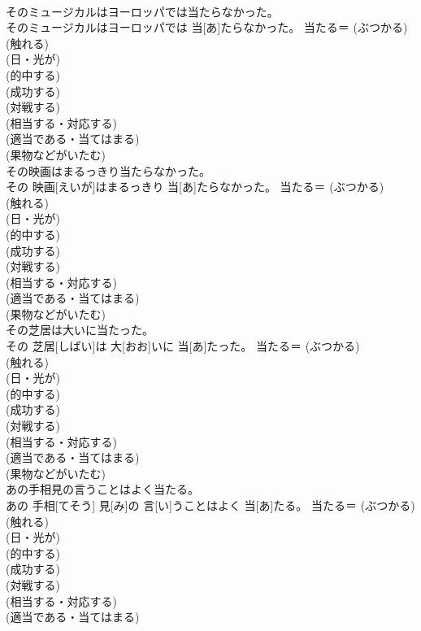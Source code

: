 \documentclass[8pt]{extreport}
\begin{document}
\begin{CJK}{UTF8}{min}
{\\	そのミュージカルはヨーロッパでは当たらなかった。	
\\	そのミュージカルはヨーロッパでは 当[あ]たらなかった。	当たる＝ (ぶつかる) 
\\	(触れる) 
\\	(日・光が) 
\\	(的中する) 
\\	(成功する) 
\\	(対戦する) 
\\	(相当する・対応する) 
\\	(適当である・当てはまる) 
\\	(果物などがいたむ)
\\	その映画はまるっきり当たらなかった。	
\\	その 映画[えいが]はまるっきり 当[あ]たらなかった。	当たる＝ (ぶつかる) 
\\	(触れる) 
\\	(日・光が) 
\\	(的中する) 
\\	(成功する) 
\\	(対戦する) 
\\	(相当する・対応する) 
\\	(適当である・当てはまる) 
\\	(果物などがいたむ)
\\	その芝居は大いに当たった。	
\\	その 芝居[しばい]は 大[おお]いに 当[あ]たった。	当たる＝ (ぶつかる) 
\\	(触れる) 
\\	(日・光が) 
\\	(的中する) 
\\	(成功する) 
\\	(対戦する) 
\\	(相当する・対応する) 
\\	(適当である・当てはまる) 
\\	(果物などがいたむ)
\\	あの手相見の言うことはよく当たる。	
\\	あの 手相[てそう] 見[み]の 言[い]うことはよく 当[あ]たる。	当たる＝ (ぶつかる) 
\\	(触れる) 
\\	(日・光が) 
\\	(的中する) 
\\	(成功する) 
\\	(対戦する) 
\\	(相当する・対応する) 
\\	(適当である・当てはまる) 
}
\end{CJK}
\end{document}
